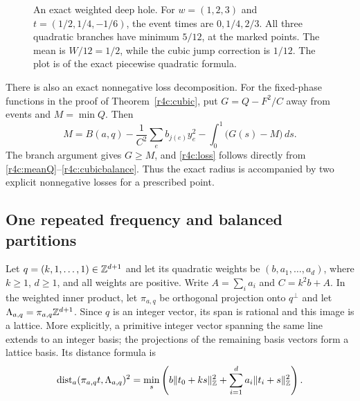 \documentclass[11pt,a4paper]{article}
\theoremstyle{definition}\newtheorem{definition}[theorem]{Definition}
\theoremstyle{remark}\newtheorem{remark}[theorem]{Remark}
\numberwithin{equation}{section}
\begin{document}
\begin{figure}[htbp]
\centering
{}
\caption{An exact weighted deep hole. For $w=(1,2,3)$ and
$t=(1/2,1/4,-1/6)$, the event times are $0,1/4,2/3$.
All three quadratic branches have minimum $5/12$, at the marked
points. The mean is $W/12=1/2$, while the cubic jump correction is
$1/12$. The plot is of the exact piecewise quadratic formula.}
\label{r4:weightedfigure}
\end{figure}

There is also an exact nonnegative loss decomposition.  For the
fixed-phase functions in the proof of Theorem~\ref{r4c:cubic}, put
$G=Q-F^2/C$ away from events and $M=\min Q$.  Then
\begin{equation}\label{r4c:loss}
 M=B(a,q)-\frac1{C^2}\sum_e b_{j(e)}y_e^2
            -\int_0^1\bigl(G(s)-M\bigr)\,ds.
\end{equation}
The branch argument gives $G\geq M$, and
\eqref{r4c:loss} follows directly from
\eqref{r4c:meanQ}--\eqref{r4c:cubicbalance}.
Thus the exact radius is accompanied by two explicit nonnegative
losses for a prescribed point.

\subsection{One repeated frequency and balanced partitions}

Let $q=(k,1,\ldots,1)\in\mathbb Z^{d+1}$ and let its quadratic weights be
$(b,a_1,\ldots,a_d)$, where $k\geq1$, $d\geq1$, and all weights are
positive.  Write $A=\sum_i a_i$ and $C=k^2b+A$.  In the weighted
inner product, let $\pi_{a,q}$ be orthogonal projection onto
$q^\perp$ and let $\Lambda_{a,q}=\pi_{a,q}\mathbb Z^{d+1}$.
Since $q$ is an integer vector, its span is rational and this image
is a lattice.  More explicitly, a primitive integer vector spanning
the same line extends to an integer basis; the projections of the
remaining basis vectors form a lattice basis.  Its distance formula
is
\[
 \operatorname{dist}_{a}(\pi_{a,q}t,\Lambda_{a,q})^2
   =\min_s\left(b\|t_0+ks\|_{\mathbb Z}^2
                   +\sum_{i=1}^d a_i\|t_i+s\|_{\mathbb Z}^2\right).
\]
\end{document}
